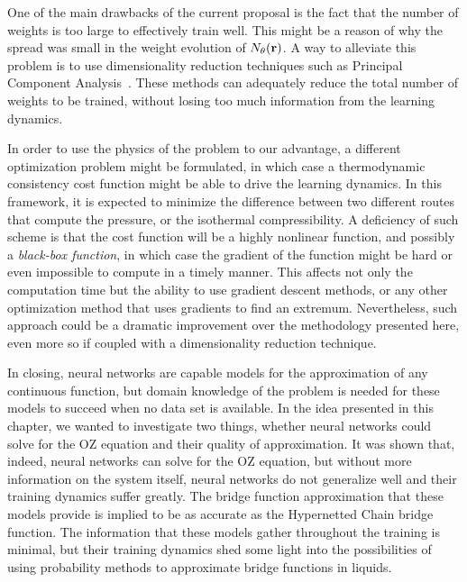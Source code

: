 One of the main drawbacks of the current proposal is the fact that the number of weights
is too large to effectively train well. This might be a reason of why the spread was
small in the weight evolution of $N_{\theta}(\mathbf{r})$. A way to alleviate this problem is to use
dimensionality reduction techniques such as
Principal Component Analysis~\cite{hastieElementsStatisticalLearning2009}. 
These methods can adequately reduce the total number of weights to be trained, without 
losing too much information from the learning dynamics.

In order to use the physics of the problem to our advantage, a different optimization
problem might be formulated, in which case a thermodynamic consistency cost function
might be able to drive the learning dynamics. In this framework, it is expected to minimize 
the difference between two different routes that compute the pressure, or the isothermal
compressibility. A deficiency of such scheme is that the cost function will be
a highly nonlinear function, and possibly a \emph{black-box function}, in which case
the gradient of the function might be hard or even impossible to compute in a timely manner.
This affects not only the computation time but the ability to use gradient descent methods,
or any other optimization method that uses gradients to find an extremum.
Nevertheless, such approach could be a dramatic improvement over the methodology presented
here, even more so if coupled with a dimensionality reduction technique.

In closing, neural networks are capable models for the approximation of any continuous function, 
but domain knowledge of the problem is needed for these models to succeed when no data set 
is available. In the idea presented in this chapter, we wanted to investigate two things, 
whether neural networks could solve for the OZ equation and their quality of approximation. 
It was shown that, indeed, neural networks can solve for the OZ equation, but without more 
information on the system itself, neural networks do not generalize well and their training 
dynamics suffer greatly. The bridge function approximation that these models provide is
implied to be as accurate as the Hypernetted Chain bridge function.
The information that these models gather throughout the training 
is minimal, but their training dynamics shed some light into the possibilities of using 
probability methods to approximate bridge functions in liquids.